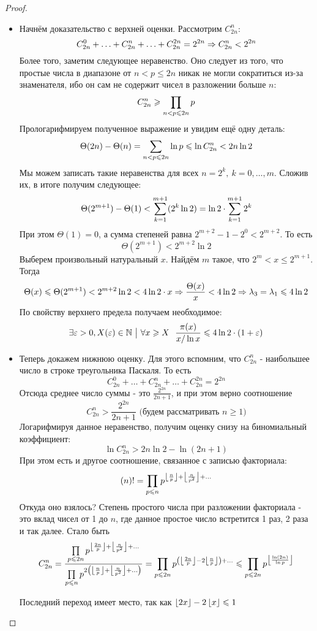 \begin{proof}
	\begin{itemize}
		\item Начнём доказательство с верхней оценки. Рассмотрим $C_{2n}^n$:
		\[
			C_{2n}^0 + \ldots + C_{2n}^n + \ldots + C_{2n}^{2n} = 2^{2n} \Rightarrow C_{2n}^n < 2^{2n}
		\]
		Более того, заметим следующее неравенство. Оно следует из того, что простые числа в диапазоне от $n < p \le 2n$ никак не могли сократиться из-за знаменателя, ибо он сам не содержит чисел в разложении больше $n$:
		\[
			C_{2n}^n \geqslant \prod\limits_{n < p \leqslant 2n} p
		\]
		Прологарифмируем полученное выражение и увидим ещё одну деталь:
		\[
			\Theta(2n) - \Theta(n) = \sum\limits_{n < p \leqslant 2n} \ln p \leqslant \ln C_{2n}^n < 2n \ln 2
		\]
		Мы можем записать такие неравенства для всех $n = 2^k,\ k = 0, \ldots, m$. Сложив их, в итоге получим следующее:
		\[
			\Theta(2^{m + 1}) - \Theta(1) < \sum\limits_{k = 1}^{m + 1} (2^k \ln 2) = \ln 2 \cdot \sum\limits_{k = 1}^{m + 1} 2^k
		\]
		При этом $\Theta(1) = 0$, а сумма степеней равна $2^{m + 2} - 1 - 2^{0} < 2^{m + 2}$. То есть
		\[
			\Theta(2^{m + 1}) < 2^{m + 2} \ln 2
		\]
		Выберем произвольный натуральный $x$. Найдём $m$ такое, что $2^m < x \le 2^{m + 1}$. Тогда
		\[
			\Theta(x) \leqslant \Theta(2^{m + 1}) < 2^{m + 2} \ln 2 < 4\ln 2 \cdot x \Rightarrow \frac{\Theta(x)}{x} < 4 \ln 2 \Rightarrow \lambda_3 = \lambda_1 \leqslant 4 \ln 2
		\]
		По свойству верхнего предела получаем необходимое:
		\[
			\exists \varepsilon > 0, X(\varepsilon) \in \mathbb{N} \ \big|\  \forall x \geqslant X\ \ \frac{\pi(x)}{x / \ln x} \leqslant 4 \ln 2 \cdot (1 + \varepsilon)
		\]
		
		
		\item Теперь докажем нижнюю оценку. Для этого вспомним, что $C_{2n}^n$ - наибольшее число в строке треугольника Паскаля. То есть
		\[
			C_{2n}^0 + \ldots + C_{2n}^n + \ldots + C_{2n}^{2n} = 2^{2n}
		\]
		Отсюда среднее число суммы - это $\frac{2^{2n}}{2n + 1}$, и при этом верно соотношение
		\[
			C_{2n}^n > \frac{2^{2n}}{2n + 1} \text{ (будем рассматривать } n \ge 1 \text{)}
		\]
		Логарифмируя данное неравенство, получим оценку снизу на биномиальный коэффициент:
		\[
			\ln C_{2n}^n > 2n \ln 2 - \ln (2n + 1)
		\]
		При этом есть и другое соотношение, связанное с записью факториала:
		\[
			(n)! = \prod\limits_{p \leqslant n} p^{\left\lfloor \frac{n}{p} \right\rfloor + \left\lfloor \frac{n}{p^2} \right\rfloor + \ldots}
		\]
		Откуда оно взялось? Степень простого числа при разложении факториала - это вклад чисел от 1 до $n$, где данное простое число встретится 1 раз, 2 раза и так далее. Стало быть
		\[
			C_{2n}^n = \frac{\prod\limits_{p \leqslant 2n} p^{\left\lfloor \frac{2n}{p} \right\rfloor + \left\lfloor \frac{n}{p^2} \right\rfloor + \ldots}}{\prod\limits_{p \leqslant n} p^{2\left(\left\lfloor \frac{n}{p} \right\rfloor + \left\lfloor \frac{n}{p^2} \right\rfloor + \ldots\right)}} = \prod\limits_{p \leqslant 2n} p^{\left(\left\lfloor \frac{2n}{p} \right\rfloor - 2\left\lfloor \frac{n}{p} \right\rfloor\right) + \ldots} \leqslant \prod\limits_{p \leqslant 2n} p^{\left\lfloor \frac{\ln (2n)}{\ln p} \right\rfloor}
		\]
		\begin{proposition}
			Последний переход имеет место, так как $\left\lfloor 2x \right\rfloor - 2\left\lfloor x \right\rfloor \leqslant 1$
		\end{proposition}
	

\end{itemize}
\end{proof}
